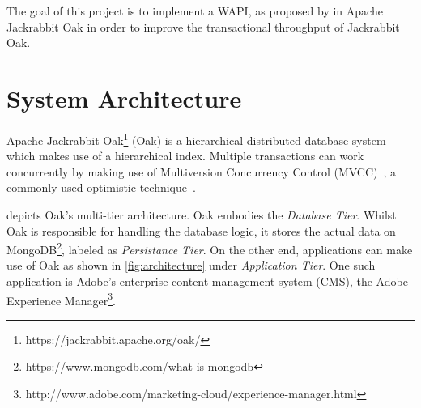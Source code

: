 \documentclass[abstracton,12pt]{scrreprt}
\begin{document}

The goal of this project is to implement a WAPI, as proposed by \cite{KW17} in Apache Jackrabbit Oak in order to improve the transactional throughput of Jackrabbit Oak.

\section{System Architecture}

Apache Jackrabbit Oak\footnote{https://jackrabbit.apache.org/oak/} (Oak) is a hierarchical distributed database system which makes use of a hierarchical index. 
Multiple transactions can work concurrently by making use of Multiversion Concurrency Control (MVCC)~\cite{GW02}, a commonly used optimistic technique~\cite{TM11}.

 depicts Oak's multi-tier architecture.
Oak embodies the \textit{Database Tier}.
Whilst Oak is responsible for handling the database logic, it stores the actual data on MongoDB\footnote{https://www.mongodb.com/what-is-mongodb}, labeled as \textit{Persistance Tier}.
On the other end, applications can make use of Oak as shown in \cref{fig:architecture} under \textit{Application Tier}.
One such application is Adobe's enterprise content management system (CMS), the Adobe Experience Manager\footnote{http://www.adobe.com/marketing-cloud/experience-manager.html}.
\end{document}
